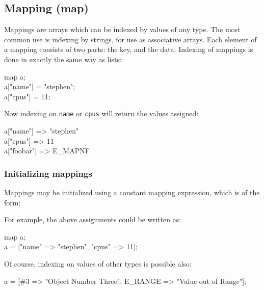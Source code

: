 \subsection{Mapping ({\bf map})}

Mappings are arrays which can be indexed by values of any type.  The
most common use is indexing by strings, for use as associative arrays.
 Each element of a mapping consists of two parts:  the key, and the
data.  Indexing of mappings is done in exactly the same way as lists:

\begin{code}
map	a; \\

a["name"] = "stephen"; \\
a["cpus"] = 11; \\
\end{code}

Now indexing on {\tt name} or {\tt cpus} will return the values assigned:

\begin{code}
a["name"]		=> "stephen"	\\
a["cpus"]		=> 11		\\
a["foobar"]		=> E\_MAPNF	\\
\end{code}

\subsubsection{Initializing mappings}

Mappings may be initialized using a constant mapping expression, which is
of the form:

\begin{code}
[ {\em key1} => {\em value1}, {\em key2} => {\em value2}, \ldots ]
\end{code}

For example, the above assignments could be written as:

\begin{code}
map	a; \\

a = ["name" => "stephen", "cpus" => 11]; \\
\end{code}

Of course, indexing on values of other types is possible also:

\begin{code}
a = [\#3 => "Object Number Three", E\_RANGE => "Value out of Range"];
\end{code}

